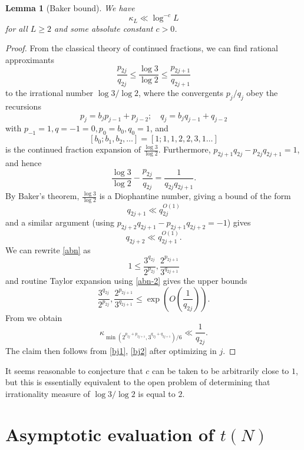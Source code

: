 \documentclass[12pt,a4paper,reqno]{amsart}
\numberwithin{equation}{section}
\theoremstyle{plain}
\newtheorem{lemma}[theorem]{Lemma}
\theoremstyle{definition}
\begin{document}
\begin{lemma}[Baker bound]\label{baker} We have
  $$ \kappa_L \ll \log^{-c} L$$
for all $L \geq 2$ and some absolute constant $c>0$.
\end{lemma}


\begin{proof}  From the classical theory of continued fractions, we can find rational approximants
\begin{equation}\label{abn}
 \frac{p_{2j}}{q_{2j}} \leq \frac{\log 3}{\log 2} \leq \frac{p_{2j+1}}{q_{2j+1}}
\end{equation}
to the irrational number $\log 3/\log 2$, where the convergents $p_j/q_j$ obey the recursions
$$ p_j = b_j p_{j-1} + p_{j-2}; \quad q_j = b_j q_{j-1} + q_{j-2}$$
with $p_{-1} = 1, q={-1}=0, p_0 = b_0, q_0=1$, and 
$$[b_0;b_1,b_2,\dots] = [1;1,1,2,2,3,1\dots]$$ 
is the continued fraction expansion of $\frac{\log 3}{\log 2}$.  Furthermore, $p_{2j+1}q_{2j} - p_{2j} q_{2j+1} = 1$, and hence
\begin{equation}\label{abn-2} 
  \frac{\log 3}{\log 2} - \frac{p_{2j}}{q_{2j}} = \frac{1}{q_{2j} q_{2j+1}}.
\end{equation}
By Baker's theorem, $\frac{\log 3}{\log 2}$ is a Diophantine number, giving a bound of the form
\begin{equation}\label{bj1}
   q_{2j+1} \ll q_{2j}^{O(1)}
\end{equation}
and a similar argument (using $p_{2j+2} q_{2j+1}-p_{2j+1} q_{2j+2} = -1$) gives
\begin{equation}\label{bj2}
 q_{2j+2} \ll q_{2j+1}^{O(1)}.
\end{equation}
We can rewrite \eqref{abn} as
$$ 1 \leq \frac{3^{q_{2j}}}{2^{p_{2j}}}, \frac{2^{p_{2j+1}}}{3^{q_{2j+1}}}$$
and routine Taylor expansion using \eqref{abn-2} gives the upper bounds
$$ \frac{3^{q_{2j}}}{2^{p_{2j}}}, \frac{2^{p_{2j+1}}}{3^{q_{2j+1}}}\leq \exp\left( O\left( \frac{1}{q_{2j}}\right)\right).$$
From  we obtain
$$
\kappa_{\min(2^{p_{2j} + p_{2j+1}}, 3^{q_{2j}+q_{2j+1}})/6} \ll \frac{1}{q_{2j}}.$$
The claim then follows from \eqref{bj1}, \eqref{bj2} after optimizing in $j$.

\end{proof}


It seems reasonable to conjecture that $c$ can be taken to be arbitrarily close to $1$, but this is essentially equivalent to the open problem of determining that irrationality measure of $\log 3 / \log 2$ is equal to $2$.


\section{Asymptotic evaluation of $t(N)$}
\end{document}
